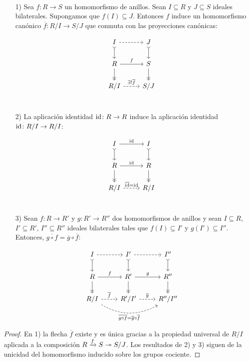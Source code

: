 \begin{corolario}
  \label{prop:funtorialidad-de-cocientes}
  ~

  \begin{enumerate}
  \item[1)] Sea $f\colon R\to S$ un homomorfismo de anillos.
    Sean $I \subseteq R$ y $J \subseteq S$ ideales bilaterales. Supongamos que
    $f (I) \subseteq J$. Entonces $f$ induce un homomorfismo canónico
    $\overline{f}\colon R/I \to S/J$ que conmuta con las proyecciones canónicas:

    \[ \begin{tikzcd}
        I\ar[dashed]{r}\ar[>->]{d} & J\ar[>->]{d} \\
        R\ar{r}{f}\ar[->>]{d} & S\ar[->>]{d} \\
        R/I\ar[dashed]{r}{\exists! \overline{f}} & S/J \\
      \end{tikzcd} \]

  \item[2)] La aplicación identidad $\mathrm{id}\colon R\to R$ induce la aplicación
    identidad $\mathrm{id}\colon R/I\to R/I$:

    \[ \begin{tikzcd}
        I\ar{r}{\idid}\ar[>->]{d} & I\ar[>->]{d} \\
        R\ar{r}{\idid}\ar[->>]{d} & R\ar[->>]{d} \\
        R/I\ar[dashed]{r}{\overline{\idid}=\idid} & R/I \\
      \end{tikzcd} \]

  \item[3)] Sean $f\colon R\to R'$ y $g\colon R'\to R''$ dos homomorfismos
    de anillos y sean $I\subseteq R$, $I'\subseteq R'$, $I''\subseteq R''$
    ideales bilaterales tales que $f (I) \subseteq I'$ y $g (I') \subseteq
    I''$. Entonces, $\overline{g\circ f} = \overline{g} \circ \overline{f}$:

    \[ \begin{tikzcd}
        I\ar[dashed]{r}\ar[>->]{d} &
        I'\ar[dashed]{r}\ar[>->]{d} &
        I''\ar[>->]{d} \\
        R\ar{r}{f}\ar[->>]{d} &
        R'\ar{r}{g}\ar[->>]{d} &
        R''\ar[->>]{d} \\
        R/I\ar[dashed]{r}{\overline{f}}\ar[dashed,bend right]{rr}[swap]{\overline{g\circ f} = \overline{g}\circ\overline{f}} &
        R'/I'\ar[dashed]{r}{\overline{g}} &
        R''/I'' \\
      \end{tikzcd} \]
  \end{enumerate}

  \begin{proof}
    En 1) la flecha $\overline{f}$ existe y es única gracias a la propiedad
    universal de $R/I$ aplicada a la composición $R\xrightarrow{f} S \twoheadrightarrow
    S/J$. Los resultados de 2) y 3) siguen de la unicidad del homomorfismo
    inducido sobre los grupos cociente.
  \end{proof}
\end{corolario}

